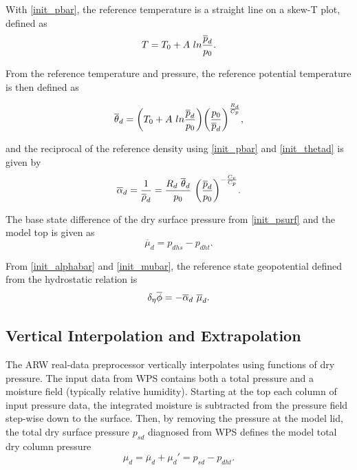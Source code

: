\noindent With \eqref{init_pbar}, the reference temperature is a straight line on a skew-T plot, defined as
\begin{equation}
T = T_0 + A~ln {\overline{p}_d \over p_0}.
\notag
\end{equation}

\noindent From the reference temperature and pressure, 
the reference potential temperature is then defined as

\noindent
\begin{equation}
\overline{\theta}_d = {\bigg( T_{0} + A~ln{\overline{p}_d \over p_{0} } \bigg) }
{\bigg( {p_0 \over \overline{p}_d } \bigg) }
^{R_d \over C_p},
\label{init_thetad}
\end{equation}

\noindent and the reciprocal of the reference density using 
\eqref{init_pbar} and \eqref{init_thetad} is given by
\begin{equation}
\overline{\alpha}_d = {1 \over \overline{\rho}_d} = {{R_d ~\overline{\theta}_d}\over p_{0} }~\bigg( 
{\overline{p}_d \over p_{0} } \bigg)^{-{C_v \over C_p}}.
\label{init_alphabar}
\end{equation}

\noindent The base state difference of the dry surface pressure 
from \eqref{init_psurf} and the model top is
given as
\begin{equation}
\overline{\mu}_d = p_{dhs} - p_{dht}.
\label{init_mubar}
\end{equation}

\noindent 
From \eqref{init_alphabar} and \eqref{init_mubar}, 
the reference state geopotential defined from the hydrostatic relation is
\begin{equation}
\delta_{\eta} \overline{\phi}  = -\overline{\alpha}_d~\overline{\mu}_d.
\notag
\end{equation}


\subsection{Vertical Interpolation and Extrapolation}
The ARW real-data preprocessor vertically interpolates using functions of dry pressure.
The input data from WPS contains both a total pressure and a moisture field (typically
relative humidity).  Starting at the top each column of input pressure data, the integrated moisture
is subtracted from the pressure field step-wise down to the surface.  
Then, by removing the pressure at the model
lid, the total dry surface pressure $p_{sd}$ diagnosed from WPS defines the
model total dry column pressure
\begin{equation}
\mu_d = \overline{\mu}_d + \mu_d' = p_{sd} - p_{dht}.
\label{init_mutotal}
\end{equation}

